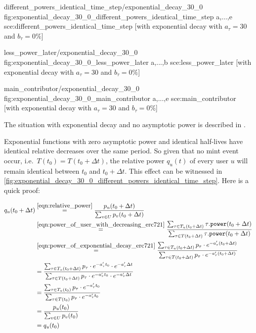 \printPowerFunctionGraphs%
  {different_powers_identical_time_step/exponential_decay_30_0}
  {fig:exponential_decay_30_0_different_powers_identical_time_step}
  {a,...,e}
  {sce:different_powers_identical_time_step}
  [with exponential decay with $a_\tau=30$ and $b_\tau=0\%$]

\printPowerFunctionGraphs%
  {less_power_later/exponential_decay_30_0}
  {fig:exponential_decay_30_0_less_power_later}
  {a,...,b}
  {sce:less_power_later}
  [with exponential decay with $a_\tau=30$ and $b_\tau=0\%$]

\printPowerFunctionGraphs%
  {main_contributor/exponential_decay_30_0}
  {fig:exponential_decay_30_0_main_contributor}
  {a,...,e}
  {sce:main_contributor}
  [with exponential decay with $a_\tau=30$ and $b_\tau=0\%$]

The situation with exponential decay and no asymptotic power is described in .%

Exponential functions with zero asymptotic power and identical half-lives have identical relative decreases over the same period.
So given that no mint event occur, i.e.\  $T(t_0) = T(t_0 + \Delta t)$, the relative power $q_u(t)$ of every user $u$ will remain identical between $t_0$ and $t_0 + \Delta t$.
This effect can be witnessed in \cref{fig:exponential_decay_30_0_different_powers_identical_time_step}.
Here is a quick proof:

\begin{equation*}
  \begin{aligned}
    q_u(t_0 + \Delta t) &\overset{\ref{eqn:relative_power}}{=} \frac{p_u(t_0 + \Delta t)}{\sum_{v\in U}p_v(t_0 + \Delta t)}\\
    &\overset{\ref{eqn:power_of_user_with_decreasing_erc721}}{=} \frac{\sum_{\tau\in T_u(t_0 + \Delta t)}\tau\mathtt{.power}(t_0 + \Delta t)}{\sum_{\tau\in T(t_0 + \Delta t)}\tau\mathtt{.power}(t_0 + \Delta t)}\\
    &\overset{\ref{eqn:power_of_exponential_decay_erc721}}{=} \frac{\sum_{\tau\in T_u(t_0+\Delta t)}p_\tau\cdot e^{-a'_\tau (t_0 + \Delta t)}}{\sum_{\tau\in T(t_0+\Delta t)}p_\tau\cdot e^{-a'_\tau (t_0 + \Delta t)}}\\
    &= \frac{\sum_{\tau\in T_u(t_0+\Delta t)}p_\tau\cdot e^{-a'_\tau t_0}\cdot e^{-a'_\tau\Delta t}}{\sum_{\tau\in T(t_0+\Delta t)}p_\tau\cdot e^{-a'_\tau t_0}\cdot e^{-a'_\tau\Delta t}}\\
    &= \frac{\sum_{\tau\in T_u(t_0)}p_\tau\cdot e^{-a'_\tau t_0}}{\sum_{\tau\in T(t_0)}p_\tau\cdot e^{-a'_\tau t_0}}\\
    &= \frac{p_u(t_0)}{\sum_{v\in U}p_v(t_0)}\\
    &= q_u(t_0)
  \end{aligned}
\end{equation*}

